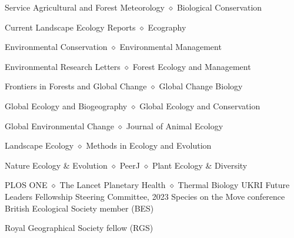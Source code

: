 
\begin{rubric}{Service}
	Agricultural and Forest Meteorology $\diamond$ Biological Conservation 
	\par Current Landscape Ecology Reports $\diamond$ Ecography 
	\par Environmental Conservation $\diamond$ Environmental Management
	\par Environmental Research Letters $\diamond$ Forest Ecology and Management
	\par Frontiers in Forests and Global Change $\diamond$ Global Change Biology
	\par Global Ecology and Biogeography $\diamond$ Global Ecology and Conservation
	\par Global Environmental Change $\diamond$ Journal of Animal Ecology
	\par Landscape Ecology $\diamond$ Methods in Ecology and Evolution
	\par Nature Ecology \& Evolution $\diamond$ PeerJ $\diamond$ Plant Ecology \& Diversity
	\par PLOS ONE $\diamond$ The Lancet Planetary Health $\diamond$ Thermal Biology
	UKRI Future Leaders Fellowship 
	Steering Committee, 2023 Species on the Move conference 
	British Ecological Society member (BES)
	\par Royal Geographical Society fellow (RGS)
\end{rubric}
